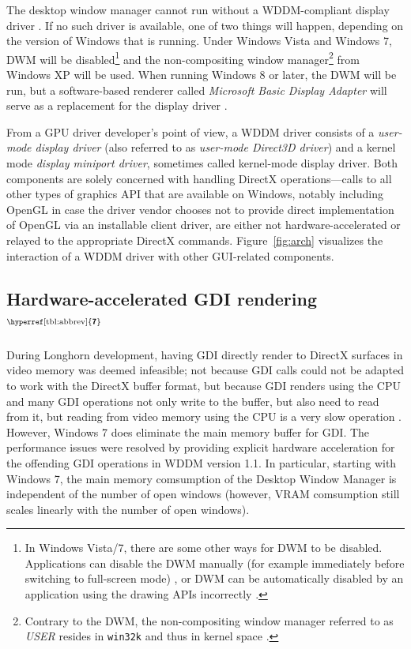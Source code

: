 \documentclass[10pt,twocolumn,a4paper]{article}
\newcommand{\bs}[1]{\textbf{\sffamily #1}}
\newcommand{\winver}[1]{$^{\text{\hyperref[tbl:abbrev]{\bs{#1}}}}$}
\newcommand{\winsubsection}[2]{\subsection[#1]{#1\winver{#2}}}
\begin{document}
			The desktop window manager cannot run without a WDDM-compliant
			display driver \cite{dwmwddm}. If no such driver is available, one
			of two things will happen, depending on the version of Windows that
			is running. Under Windows Vista and Windows 7, DWM will be
			disabled\footnote{In Windows Vista/7, there are some other ways for
			DWM to be disabled. Applications can disable the DWM manually (for
			example immediately before switching to full-screen mode)
			\cite{disabledwm}, or DWM can be automatically disabled by an
			application using the drawing APIs incorrectly \cite{dwmredirect}.}
			and the non-compositing window manager\footnote{Contrary to the DWM,
			the non-compositing window manager referred to as \textit{USER} resides
			in \texttt{win32k} and thus in kernel space \cite{probertwin32k}.}
			from Windows XP will be used. When running Windows 8 or later,
			the DWM will be run, but a software-based renderer called
			\textit{Microsoft Basic Display Adapter} will serve as a replacement
			for the display driver \cite{dwmalwayson}.

			From a GPU driver developer's point of view, a WDDM driver consists
			of a \textit{user-mode display driver} (also referred to as
			\textit{user-mode Direct3D driver}) and a kernel mode
			\textit{display miniport driver}, sometimes called kernel-mode
			display driver. Both components are solely concerned with handling
			DirectX operations---calls to all other types of graphics API that
			are available on Windows, notably including OpenGL in case the driver
			vendor chooses not to provide direct implementation of OpenGL via
			an installable client driver, are either not
			hardware-accelerated or relayed to the appropriate DirectX commands.
			Figure~\ref{fig:arch} visualizes the interaction of a WDDM driver with
			other GUI-related components.
			\cite{wddmarch,d2dvsgdi}

		\winsubsection{Hardware-accelerated GDI ren\-der\-ing}{7}
			During Longhorn development, having GDI directly render to DirectX
			surfaces in video memory was deemed infeasible; not because GDI calls
			could not be adapted to work with the DirectX buffer format, but because
			GDI renders using the CPU and many GDI operations not only write to
			the buffer, but also need to read from it, but reading from video memory
			using the CPU is a very slow operation \cite{dwmredirect}. However,
			Windows 7 does eliminate the main memory buffer for GDI. The performance
			issues were resolved by providing explicit hardware acceleration for
			the offending GDI operations in WDDM version 1.1. In particular,
			starting with Windows 7, the
			main memory comsumption of the Desktop Window Manager is independent
			of the number of open windows (however, VRAM comsumption still scales
			linearly with the number of open windows).
			\cite{win7}

	\onecolumn{\printbibliography}
\end{document}
